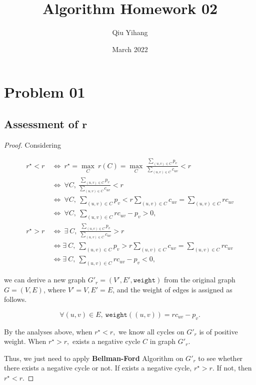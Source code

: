 \documentclass{article}
\title{\textbf{Algorithm Homework 02}}
\author{Qiu Yihang}
\date{March 2022}
\begin{document}
\maketitle

\section{Problem 01}

\vspace{1em}
\subsection{Assessment of $\boldsymbol{r}$}
\vspace{1em}
\begin{proof}
    Considering
    
    \vspace{-2.5em}
    \begin{align*}
        r^{\star}<r\ &\Longleftrightarrow\ r^{\star} = \underset{C}{\max}\ {r(C)} = \underset{C}{\max}\ \frac{\sum_{(u,v)\in C}p_v}{\sum_{(u,v)\in C}c_{uv}}<r \\
        &\Longleftrightarrow\ \forall C,\ \frac{\sum_{(u,v)\in C}p_v}{\sum_{(u,v)\in C}c_{uv}}<r \\
        &\Longleftrightarrow\ \forall C,\ \sum_{(u,v)\in C}p_v < r\sum_{(u,v)\in C}c_{uv} = \sum_{(u,v)\in C}rc_{uv} \\ 
        &\Longleftrightarrow\ \forall C,\ \sum_{(u,v)\in C}rc_{uv}-p_{v} > 0,
        \\
        r^{\star}>r\ &\Longleftrightarrow\ \exists\ C,\ \frac{\sum_{(u,v)\in C}p_v}{\sum_{(u,v)\in C}c_{uv}}>r  \\
        &\Longleftrightarrow \exists\ C,\ \sum_{(u,v)\in C}p_v>r\sum_{(u,v)\in C}c_{uv}= \sum_{(u,v)\in C}rc_{uv} \\
        &\Longleftrightarrow \exists\ C,\ \sum_{(u,v)\in C}rc_{uv}-p_v<0,
    \end{align*}
    
    \vspace{-0.5em} \hspace{1.3em}
    we can derive a new graph $G'_{r}=(V',E',\mathtt{weight})$ from the original graph $G=(V,E)$, where $V'=V,E'=E$, and the weight of edges is assigned as follows.
    
    \vspace{-1.2em}
    $$\forall (u,v)\in E,\ \mathtt{weight}\left(\left(u,v\right)\right) = rc_{uv}-p_{v}.$$
    
    \vspace{-0.5em} \hspace{1.3em}
    By the analyses above, when $r^{\star}<r,$ we know all cycles on $G'_{r}$ is of positive weight. When $r^{\star}>r,$ exists a negative cycle $C$ in graph $G'_{r}$.
    
    \vspace{2.5em}\hspace{1.3em}
    Thus, we just need to apply \textbf{Bellman-Ford} Algorithm on $G'_{r}$ to see whether there exists a negative cycle or not. If exists a negative cycle, $r^{\star}>r.$ If not, then $r^{\star}<r.$
\end{proof}
\end{document}
